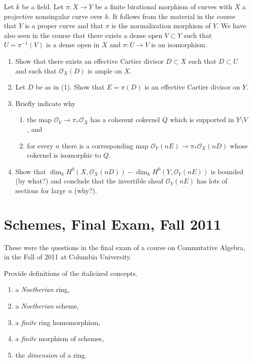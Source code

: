\begin{exercise}
\label{exercise-birational-morphism-curves-ample}
Let $k$ be a field. Let $\pi : X \to Y$ be a finite birational
morphism of curves with $X$ a projective nonsingular curve over $k$.
It follows from the material in the course that $Y$ is a proper curve and
that $\pi$ is the normalization morphism of $Y$.
We have also seen in the course that there exists a dense open $V \subset Y$
such that $U = \pi^{-1}(V)$ is a dense open in $X$ and $\pi : U \to V$
is an isomorphism.
\begin{enumerate}
\item Show that there exists an effective Cartier divisor $D \subset X$
such that $D \subset U$ and such that $\mathcal{O}_X(D)$ is ample on $X$.
\item Let $D$ be as in (1). Show that $E = \pi(D)$ is an effective Cartier
divisor on $Y$.
\item Briefly indicate why
\begin{enumerate}
\item the map $\mathcal{O}_Y \to \pi_*\mathcal{O}_X$ has a coherent cokernel
$Q$ which is supported in $Y \setminus V$, and
\item for every $n$ there is a corresponding map
$\mathcal{O}_Y(nE) \to \pi_*\mathcal{O}_X(nD)$
whose cokernel is isomorphic to $Q$.
\end{enumerate}
\item Show that
$\dim_k H^0(X, \mathcal{O}_X(nD)) - \dim_k H^0(Y, \mathcal{O}_Y(nE))$
is bounded (by what?) and conclude that the invertible sheaf
$\mathcal{O}_Y(nE)$ has lots of sections for large $n$ (why?).
\end{enumerate}
\end{exercise}





\section{Schemes, Final Exam, Fall 2011}
\label{section-final-exam-fall-2011}

\noindent
These were the questions in the final exam of a course on
Commutative Algebra, in the Fall of 2011 at Columbia University.


\begin{exercise}[Definitions]
\label{exercise-definitions-fall-2011}
Provide definitions of the italicized concepts.
\begin{enumerate}
\item a {\it Noetherian} ring,
\item a {\it Noetherian} scheme,
\item a {\it finite} ring homomorphism,
\item a {\it finite} morphism of schemes,
\item the {\it dimension} of a ring.
\end{enumerate}
\end{exercise}


